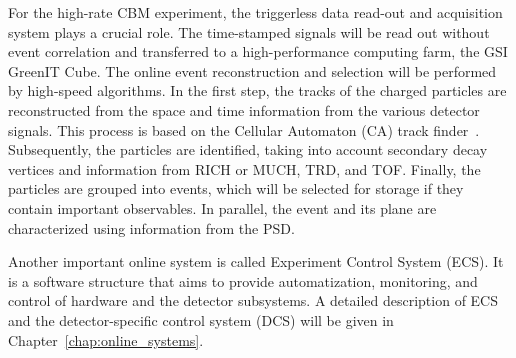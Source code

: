For the high-rate CBM experiment, the triggerless data read-out and acquisition system plays a crucial role. The time-stamped signals will be read out without event correlation and transferred to a high-performance computing farm, the GSI GreenIT Cube. The online event reconstruction and selection will be performed by high-speed algorithms. In the first step, the tracks of the charged particles are reconstructed from the space and time information from the various detector signals. This process is based on the Cellular Automaton (\gls{CA}) track finder~\cite{CA}. Subsequently, the particles are identified, taking into account secondary decay vertices and information from \gls{RICH} or \gls{MUCH}, \gls{TRD}, and \gls{TOF}. Finally, the particles are grouped into events, which will be selected for storage if they contain important observables. In parallel, the event and its plane are characterized using information from the PSD.

Another important online system is called Experiment Control System (\gls{ECS}). It is a software structure that aims to provide automatization, monitoring, and control of hardware and the detector subsystems. A detailed description of \gls{ECS} and the detector-specific control system (\gls{DCS}) will be given in Chapter~\ref{chap:online_systems}.



